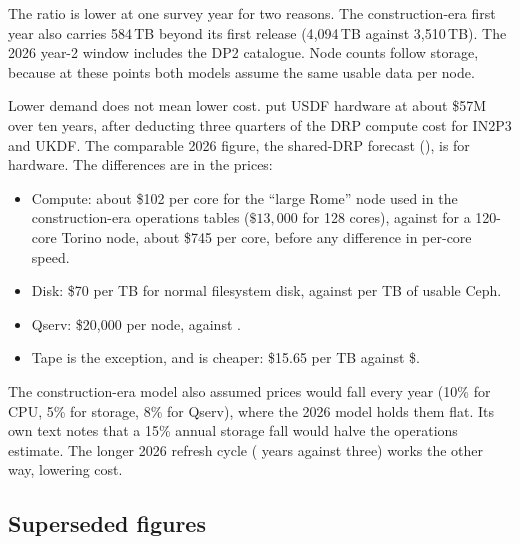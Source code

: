 The ratio is lower at one survey year for two reasons. The construction-era first year
also carries 584\,TB beyond its first release (4{,}094\,TB against 3{,}510\,TB).
The 2026 year-2 window includes the DP2 catalogue. Node counts follow storage,
because at these points both models assume the same usable data per node.

Lower demand does not mean lower cost.  put USDF
hardware at about \$57M over ten years, after deducting three quarters of the
DRP compute cost for IN2P3 and UKDF. The comparable 2026 figure, the shared-DRP forecast
(), is \smSplitTenYearHardware{} for hardware. The
differences are in the prices:
\begin{itemize}
\item Compute: about \$102 per core for the ``large Rome'' node used in the
      construction-era operations tables ($\$13{,}000$ for 128 cores), against
      \smTorinoUSD{} for a 120-core Torino node, about \$745 per core, before
      any difference in per-core speed.
\item Disk: \$70 per TB for normal filesystem disk, against \smCephPerTB{} per
      TB of usable Ceph.
\item Qserv: \$20{,}000 per node, against \smKeightsUSD{}.
\item Tape is the exception, and is cheaper: \$15.65 per TB against
      \$\smTapePerTB{}.
\end{itemize}
The construction-era model also assumed prices would fall every year (10\% for
CPU, 5\% for storage, 8\% for Qserv), where the 2026 model holds them flat. Its
own text notes that a 15\% annual storage fall would halve the operations
estimate. The longer 2026 refresh cycle (\smLifeCompute{} years against three)
works the other way, lowering cost.



\subsection{Superseded figures}

